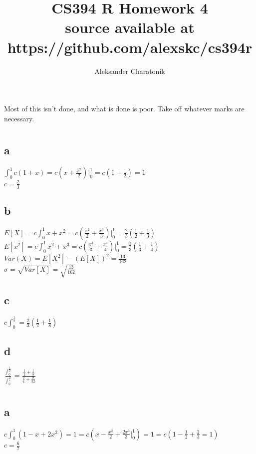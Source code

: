 \documentclass[12pt]{article}
\title{CS394 R Homework 4\\
\large source available at https://github.com/alexskc/cs394r}
\author{Aleksander Charatonik}
\begin{document}
\maketitle

Most of this isn't done, and what is done is poor. Take off whatever marks are necessary.

\section{}
\subsection*{a}
\(\int_0^1 c(1+x) = c(x + \frac{x^2}{2})|_0^1 = c(1 + \frac{1}{2}) = 1\)\\
\(c = \frac{2}{3}\)\\
\subsection*{b}
\(E[X] = c \int_0^1 x + x^2 = c(\frac{x^2}{2} + \frac{x^3}{3})|_0^1 = \frac{2}{3}(\frac{1}{2} + \frac{1}{3})\)\\
\(E[x^2] = c \int_0^1 x^2 + x^3 = c(\frac{x^3}{3} + \frac{x^4}{4})|_0^1 = \frac{2}{3}(\frac{1}{3}+\frac{1}{4})\)\\
\(Var(X) = E[X^2] - (E[X])^2 = \frac{13}{162}\)\\
\(\sigma = \sqrt{Var[X]} = \sqrt{\frac{13}{162}}\)\\
\subsection*{c}
\(c \int_0^\frac{1}{2} = \frac{2}{3}(\frac{1}{2} + \frac{1}{8})\)
\subsection*{d}
\(\frac{\int_0^{\frac{1}{2}}}{\int_0^{\frac{3}{4}}} = \frac{\frac{1}{2} + \frac{1}{8}}{\frac{3}{4} + \frac{9}{32}}\)
\section{}


\section{}
\subsection*{a}
\(c \int_0^1(1 - x + 2x^2) = 1 = c(x - \frac{x^2}{2} +\frac{2x^3}{3}|_0^1) = 1 = c(1 - \frac{1}{2} + \frac{2}{3} = 1)\)\\
\(c = \frac{6}{7}\)\\
\end{document}
